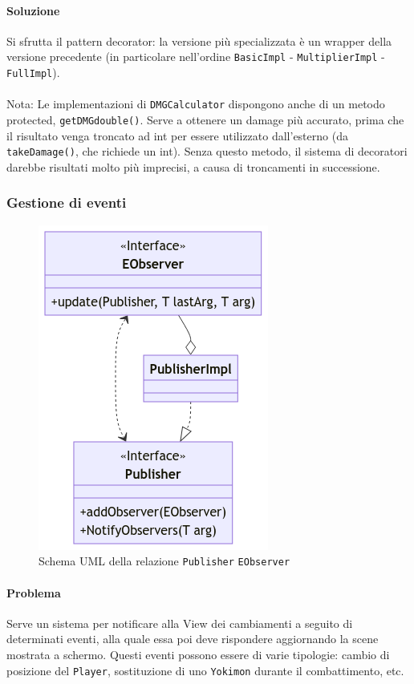 \documentclass[a4paper,12pt]{report}
\begin{document}
\paragraph{Soluzione} Si sfrutta il pattern decorator: la versione più specializzata è un wrapper della versione precedente (in particolare nell’ordine \texttt{BasicImpl} - \texttt{MultiplierImpl} - \texttt{FullImpl}). \\
\footnotesize \\
Nota: Le implementazioni di \texttt{DMGCalculator} dispongono anche di un metodo protected, \texttt{getDMGdouble()}.
%
Serve a ottenere un damage più accurato, prima che il risultato venga troncato ad int per essere utilizzato dall’esterno (da \texttt{takeDamage()}, che richiede un int). Senza questo metodo, il sistema di decoratori darebbe risultati molto più imprecisi, a causa di troncamenti in successione.
\normalsize
\subsubsection{Gestione di eventi}
\begin{figure}[H]
\centering{}
\includegraphics[width=0.4\columnwidth]{images/uml-publisher.png}
\caption{Schema UML della relazione \texttt{Publisher} \texttt{EObserver}}
\label{img:uml-publisher}
\end{figure}
\paragraph{Problema} Serve un sistema per notificare alla View dei cambiamenti a seguito di determinati eventi, alla quale essa poi deve rispondere aggiornando la scene mostrata a schermo. 
%
Questi eventi possono essere di varie tipologie: cambio di posizione del \texttt{Player}, sostituzione di uno \texttt{Yokimon} durante il combattimento, etc.
\end{document}

